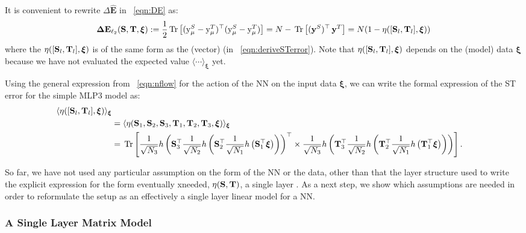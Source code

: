 It is convenient to rewrite $\Delta \mathbf{\hat{E}}$ in \EQN~\ref{eqn:DE} as:
\begin{align}
\label{eqn:DE2}
\mathbf{\Delta {E}}_{\ell_2}({\mathbf{S}},{\mathbf{T}}, \boldsymbol{\xi})
   := \frac{1}{2} \mbox{}\operatorname{Tr}\left[ (\mathrm{y}_{\mu}^{S} - \mathrm{y}_{\mu}^{T})^\top (\mathrm{y}_{\mu}^{S} - \mathrm{y}_{\mu}^{T}) \right]
   = N - \mbox{}\operatorname{Tr}\left[ (\mathbf{y}^{S})^{\top} \, \mathbf{y}^{T}  \right]
   = N(1 - \eta([{\mathbf{S}}_l,{\mathbf{T}}_l],\boldsymbol{\xi}))
\end{align}
where the \SelfOverlap $\eta([{\mathbf{S}}_l,{\mathbf{T}}_l],\boldsymbol{\xi})$
is of the same form as the (vector) \LinearPerceptron (in \EQN~\ref{eqn:deriveSTerror}).
Note that $\eta([{\mathbf{S}}_l,{\mathbf{T}}_l],\boldsymbol{\xi})$ depends on the (model) data $\boldsymbol{\xi}$
because we have not evaluated the expected value $\langle \cdots \rangle_{\boldsymbol{\xi}}$ yet.

Using the general expression from \EQN~\ref{eqn:nflow} for the action of the NN on the input data $\boldsymbol{\xi}$,
we can write the formal expression of the ST error for the simple MLP3 model as:
\begin{align}
\label{eqn:overlap1}
\langle\eta([{\mathbf{S}}_l,{\mathbf{T}}_l],\boldsymbol{\xi})\rangle_{\boldsymbol{\xi}}  \\ \nonumber
& =\langle\eta({\mathbf{S}}_1,{\mathbf{S}}_2,{\mathbf{S}}_3,{\mathbf{T}}_1,{\mathbf{T}}_2,{\mathbf{T}}_3,\boldsymbol{\xi})\rangle_{\boldsymbol{\xi}}  \\ \nonumber
& =  \mbox{}\operatorname{Tr}\left[
    \frac{1}{\sqrt{N_3}} h\left(\mathbf{S}_3^{\top} 
    \frac{1}{\sqrt{N_2}} h\left(\mathbf{S}_2^{\top} 
    \frac{1}{\sqrt{N_1}} h\left(\mathbf{S}_1^{\top} \boldsymbol{\xi} \right)\right)\right)^{\top} 
    \times
    \frac{1}{\sqrt{N_3}} h\left(\mathbf{T}_3^{\top} 
    \frac{1}{\sqrt{N_2}} h\left(\mathbf{T}_2^{\top} 
    \frac{1}{\sqrt{N_1}} h\left(\mathbf{T}_1^{\top} \boldsymbol{\xi} \right)\right)\right)
  \right].
\end{align}

So far, we have not used any particular assumption on the form of the NN or the data, 
other than that the layer structure used to write the explicit expression for the form eventually xneeded,
$\eta({\mathbf{S}},{\mathbf{T}})$, a single layer \SelfOverlap.
As a next step, we show which assumptions are needed in order to reformulate the setup as
an effectively a single layer linear model for a NN.


\subsubsection{A Single Layer Matrix Model}

